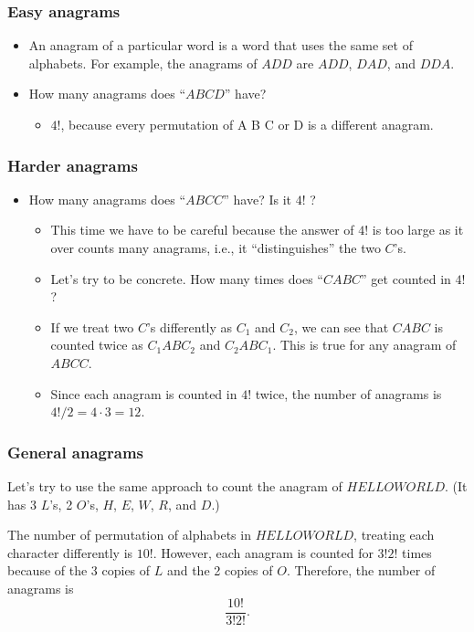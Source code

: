 \begin{frame}\frametitle{Easy anagrams}
  \begin{itemize}
  \item An anagram of a particular word is a word that uses the same
    set of alphabets.  For example, the anagrams of $ADD$ are $ADD$,
    $DAD$, and $DDA$. \pause
  \item How many anagrams does ``$ABCD$'' have? \pause
    \begin{itemize}
    \item $4!$, because every permutation of A B C or D is a different
      anagram. \pause
    \end{itemize}
  \end{itemize}
\end{frame}

\begin{frame}\frametitle{Harder anagrams}
  \begin{itemize}
  \item How many anagrams does ``$ABCC$'' have? Is it $4!$ ? \pause
    \begin{itemize}
    \item This time we have to be careful because the answer of $4!$
      is too large as it over counts many anagrams, i.e., it
      ``distinguishes'' the two $C$'s. \pause
    \item Let's try to be concrete. How many times does ``$CABC$'' get
      counted in $4!$? \pause
    \item If we treat two $C$'s differently as $C_1$ and $C_2$, we can
      see that $CABC$ is counted twice as $C_1ABC_2$ and $C_2ABC_1$.
      This is true for any anagram of $ABCC$.  \pause
    \item Since each anagram is counted in $4!$ twice, the number of
      anagrams is $4! / 2 = 4\cdot 3 = 12$.
    \end{itemize}
  \end{itemize}
\end{frame}

\begin{frame}\frametitle{General anagrams}
  \begin{tcolorbox}
    Let's try to use the same approach to count the anagram of
    $HELLOWORLD$. (It has 3 $L$'s, 2 $O$'s, $H$, $E$, $W$, $R$, and
    $D$.)
  \end{tcolorbox}
  
  \pause
  \vspace{0.2in}
  
  The number of permutation of alphabets in $HELLOWORLD$, treating
  each character differently is $10!$.  However, each anagram is
  counted for $3!2!$ times because of the 3 copies of $L$ and the 2
  copies of $O$.  Therefore, the number of anagrams is
  \[
  \frac{10!}{3!2!}.
  \]
\end{frame}

